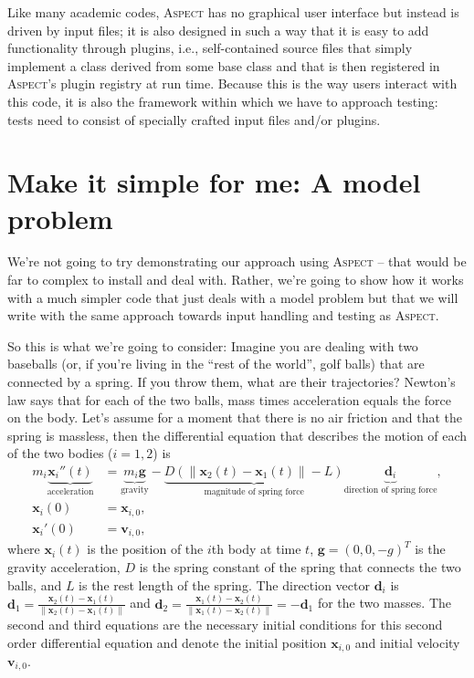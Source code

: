 \documentclass{article}
\newcommand{\aspect}{\textsc{Aspect}}
\begin{document}
Like many academic codes, \aspect{} has no graphical user interface but
instead is driven by input files; it is also designed in such a way that it is
easy to add functionality through plugins, i.e., self-contained source files
that simply implement a class derived from some base class and that is then
registered in \aspect{}'s plugin registry at run time. Because this is the way
users interact with this code, it is also the framework within which we have
to approach testing: tests need to consist of specially crafted input files
and/or plugins.


\section{Make it simple for me: A model problem}

We're not going to try demonstrating our approach using \aspect{} -- that
would be far to complex to install and deal with. Rather, we're going to show
how it works with a much simpler code that just deals with a model problem but
that we will write with the same approach towards input handling and testing
as \aspect{}.

So this is what we're going to consider: Imagine you are dealing with two
baseballs (or, if you're living in the ``rest of the world'', golf balls) that
are connected by a spring. If you throw them, what are their trajectories?
Newton's law says that for each of the two balls, mass times acceleration
equals the force on the body. Let's assume for a moment that there is no air
friction and that the spring is massless, then the differential equation that
describes the motion of each of the two bodies ($i=1,2$) is
\begin{align}
  \label{eq:ode}
  m_i 
  \underbrace{\mathbf x_i''(t)}_{\text{acceleration}}
  &=
  \underbrace{m_i \mathbf g}_{\text{gravity}}
  -
  \underbrace{D (\|\mathbf x_2(t) - \mathbf x_1(t)\| - L)}_{\text{magnitude of
    spring force}}
\underbrace{\mathbf d_i}_{\text{direction of spring force}},
\\
\label{eq:ic1}
  \mathbf x_i(0) &= \mathbf x_{i,0},
\\
\label{eq:ic2}
  \mathbf x_i'(0) &= \mathbf v_{i,0},
\end{align}
where $\mathbf x_i(t)$ is the position of the $i$th body at time $t$, $\mathbf
g=(0,0,-g)^T$ is the gravity acceleration, $D$ is the spring constant of
the spring that connects the two balls, and $L$ is the rest length of the
spring. The direction vector $\mathbf d_i$ is
$\mathbf d_1 = \frac{\mathbf x_2(t) - \mathbf x_1(t)}{\|\mathbf x_2(t) - \mathbf
    x_1(t)\|}$
and
$\mathbf d_2 = \frac{\mathbf x_1(t) - \mathbf x_2(t)}{\|\mathbf x_1(t) - \mathbf
    x_2(t)\|}=-\mathbf d_1$ for the two masses.
The second and third equations are the necessary initial conditions
for this second order differential equation and denote the initial position
$\mathbf x_{i,0}$ and initial velocity $\mathbf v_{i,0}$.
\end{document}
